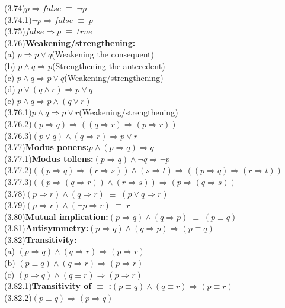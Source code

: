 \documentclass[12pt, fleqn, leqno]{article}
\newcommand{\lgap}{2pt}                             %
\newcommand{\equivs}{\ensuremath{\;\equiv\;}}       %
\newcommand{\impl}{\ensuremath{\Rightarrow}}        %
\begin{document}
\begin{tabbing}
(3.74)\>$p\impl false \equivs \neg p$\\[\lgap]
(3.74.1)\>$\neg p\impl false \equivs p$\\[\lgap]
(3.75)\>$false\impl p \equivs true$\\[\lgap]
(3.76)\>\textbf{Weakening/strengthening:}\\
      \> (a)\> $p\impl p\lor q$\quad \quad \quad (Weakening the consequent)\\[\lgap]
      \> (b)\> $p\land q \impl p$\quad \quad \quad (Strengthening the antecedent)\\[\lgap]
      \> (c)\> $p\land q \impl p\lor q$\quad \quad \quad (Weakening/strengthening)\\[\lgap]
      \> (d)\> $p\lor (q\land r) \impl p\lor q$\\[\lgap]
      \> (e)\> $p\land q \impl p\land (q \lor r)$\\[\lgap]
(3.76.1)\>$p\land q \impl p\lor r$\quad \quad \quad (Weakening/strengthening)\\[\lgap]
(3.76.2)\>$(p\impl q) \impl ((q\impl r)\impl (p\impl r))$\\[\lgap]
(3.76.3)\>$(p\lor q) \land (q \impl r)\impl p\lor r$\\[\lgap]
(3.77)\>\textbf{Modus ponens:}\quad $p\land (p\impl q)\impl q$\\[\lgap]
(3.77.1)\>\textbf{Modus tollens:}\quad $(p\impl q)\land \neg q \impl \neg p$\\[\lgap]
(3.77.2)\>$((p \impl q) \impl (r \impl s)) \land (s \impl t) \impl ((p \impl q) \impl (r \impl t))$\\[\lgap]
(3.77.3)\>$((p \impl (q \impl r )) \land (r \impl s)) \impl (p \impl (q \impl s))$\\[\lgap]
(3.78)\>$(p\impl r) \land (q\impl r) \equivs (p\lor q\impl r)$\\[\lgap]
(3.79)\>$(p\impl r) \land (\neg p\impl r) \equivs r$\\[\lgap]
(3.80)\>\textbf{Mutual implication:}\quad $(p\impl q) \land (q\impl p) \equivs (p\equiv q)$\\[\lgap]
(3.81)\>\textbf{Antisymmetry:}\quad $(p\impl q) \land (q\impl p) \impl (p\equiv q)$\\[\lgap]
(3.82)\>\textbf{Transitivity:}\\
      \> (a)\> $(p\impl q) \land (q\impl r) \impl (p\impl r)$\\[\lgap]
      \> (b)\> $(p\equiv q) \land (q\impl r) \impl (p\impl r)$\\[\lgap]
      \> (c)\> $(p\impl q) \land (q\equiv r) \impl (p\impl r)$\\[\lgap]
(3.82.1)\>\textbf{Transitivity of $\equiv$ :}\quad $(p\equiv q)\land (q\equiv r)\impl (p\equiv r)$\\[\lgap]
(3.82.2)\>$(p\equiv q)\impl (p\impl q)$\\
\end{tabbing}
\end{document}
